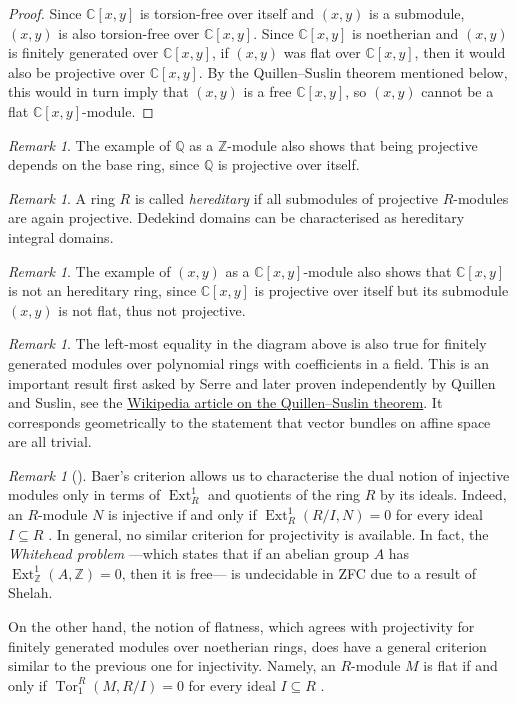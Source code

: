 \documentclass[A4paper, 12pt, british, reqno]{amsart}
\newcommand{\C}{\mathbb{C}} %
\newcommand{\Q}{\mathbb{Q}} %
\newcommand{\Z}{\mathbb{Z}} %
\theoremstyle{plain}
\theoremstyle{definition}
\theoremstyle{remark}
\newtheorem{rem}[thm]{Remark}
\theoremstyle{plain}
\theoremstyle{definition}
\theoremstyle{remark}
\theoremstyle{plain}
\theoremstyle{definition}
\theoremstyle{remark}
\DeclareMathOperator{\Ext}{Ext}
\DeclareMathOperator{\Tor}{Tor}
\begin{document}
{\begin{proof}
    Since $\C[x,y]$ is torsion-free over itself and $(x,y)$ is a submodule, $(x,y)$ is also torsion-free over $\C[x,y]$.
    Since $\C[x,y]$ is noetherian and $(x,y)$ is finitely generated over $\C[x,y]$, if $(x,y)$ was flat over $\C[x,y]$, then it would also be projective over $\C[x,y]$.
    By the Quillen--Suslin theorem mentioned below, this would in turn imply that $(x,y)$ is a free $\C[x,y]$, so $(x,y)$ cannot be a flat $\C[x,y]$-module.
\end{proof}

\begin{rem}
    The example of $\Q$ as a $\Z$-module also shows that being projective depends on the base ring, since $\Q$ is projective over itself.
\end{rem}

\begin{rem}
    A ring $R$ is called \textit{hereditary} if all submodules of projective $R$-modules are again projective.
    Dedekind domains can be characterised as hereditary integral domains.
\end{rem}

\begin{rem}
    The example of $(x,y)$ as a $\C[x,y]$-module also shows that $\C[x,y]$ is not an hereditary ring, since $\C[x,y]$ is projective over itself but its submodule $(x,y)$ is not flat, thus not projective.
\end{rem}

\begin{rem}
    The left-most equality in the diagram above is also true for finitely generated modules over polynomial rings with coefficients in a field.
    This is an important result first asked by Serre and later proven independently by Quillen and Suslin, see the \href{https://en.wikipedia.org/wiki/Quillen-Suslin_theorem}{Wikipedia article on the Quillen--Suslin theorem}.
    It corresponds geometrically to the statement that vector bundles on affine space are all trivial.
\end{rem}

\begin{rem}[{\cite{fra18}}]
    Baer's criterion \cite[Prop.~1.1.1]{fra18} allows us to characterise the dual notion of injective modules only in terms of $\Ext^{1}_{R}$ and quotients of the ring $R$ by its ideals.
    Indeed, an $R$-module $N$ is injective if and only if $\Ext^{1}_{R}(R/I,N)=0$ for every ideal $I\subseteq R$ \cite[Prop.~1.1.4]{fra18}.
    In general, no similar criterion for projectivity is available.
    In fact, the \textit{Whitehead problem} ---which states that if an abelian group $A$ has $\Ext^{1}_{\Z}(A,\Z)=0$, then it is free--- is undecidable in ZFC due to a result of Shelah.

    On the other hand, the notion of flatness, which agrees with projectivity for finitely generated modules over noetherian rings, does have a general criterion similar to the previous one for injectivity.
    Namely, an $R$-module $M$ is flat if and only if $\Tor_{1}^{R}(M,R/I)=0$ for every ideal $I\subseteq R$ \cite[Prop.~1.2.3]{fra18}.
\end{rem}
}
\end{document}
